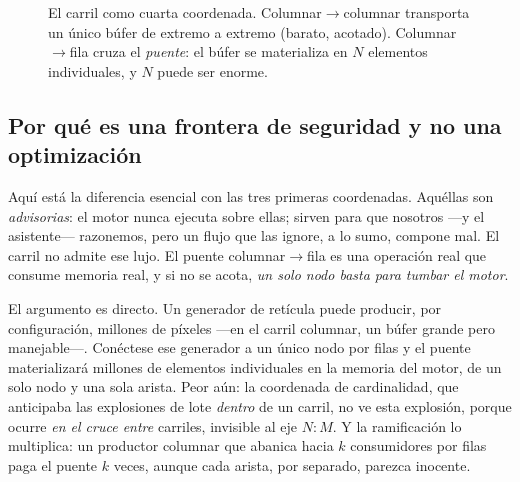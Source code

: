 \documentclass[11pt,a4paper]{article}
\theoremstyle{definition}
\theoremstyle{plain}
\begin{document}
\begin{figure}[h]
\centering
{}
\caption{El carril como cuarta coordenada. Columnar$\to$columnar transporta un único
búfer de extremo a extremo (barato, acotado). Columnar$\to$fila cruza el
\emph{puente}: el búfer se materializa en $N$ elementos individuales, y $N$ puede ser
enorme.}
\label{fig:lane}
\end{figure}

\subsection{Por qué es una frontera de seguridad y no una optimización}

Aquí está la diferencia esencial con las tres primeras coordenadas. Aquéllas son
\emph{advisorias}: el motor nunca ejecuta sobre ellas; sirven para que nosotros ---y
el asistente--- razonemos, pero un flujo que las ignore, a lo sumo, compone mal. El
carril no admite ese lujo. El puente columnar$\to$fila es una operación real que
consume memoria real, y si no se acota, \emph{un solo nodo basta para tumbar el
motor}.

El argumento es directo. Un generador de retícula puede producir, por configuración,
millones de píxeles ---en el carril columnar, un búfer grande pero manejable---.
Conéctese ese generador a un único nodo por filas y el puente materializará millones
de elementos individuales en la memoria del motor, de un solo nodo y una sola arista.
Peor aún: la coordenada de cardinalidad, que anticipaba las explosiones de lote
\emph{dentro} de un carril, no ve esta explosión, porque ocurre \emph{en el cruce
entre} carriles, invisible al eje $N{:}M$. Y la ramificación lo multiplica: un
productor columnar que abanica hacia $k$ consumidores por filas paga el puente $k$
veces, aunque cada arista, por separado, parezca inocente.
\end{document}

